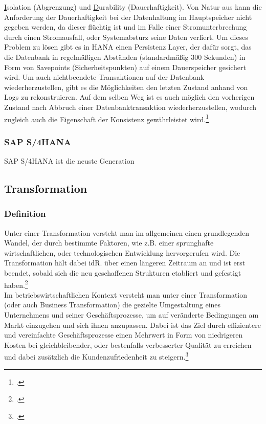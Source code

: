 \underline{I}solation (Abgrenzung) und \underline{D}urability (Dauerhaftigkeit). Von Natur aus kann die Anforderung der Dauerhaftigkeit bei der Datenhaltung im Hauptspeicher nicht gegeben werden, da dieser flüchtig ist und im Falle einer Stromunterbrechung durch einen Stromausfall, oder Systemabsturz seine Daten verliert. Um dieses Problem zu lösen gibt es in HANA einen \glqq{}Persistenz Layer\grqq{}, der dafür sorgt, das die Datenbank in regelmäßigen Abständen (standardmäßig 300 Sekunden) in Form von \glqq{}Savepoints\grqq{} (Sicherheitspunkten) auf einem Dauerspeicher gesichert wird. Um auch nichtbeendete Transaktionen auf der Datenbank wiederherzustellen, gibt es die Möglichkeiten den letzten Zustand anhand von Logs zu rekonstruieren. Auf dem selben Weg ist es auch möglich den vorherigen Zustand nach Abbruch einer Datenbanktransaktion wiederherzustellen, wodurch zugleich auch die Eigenschaft der Konsistenz gewährleistet wird.\footcite[Vgl.][]{rz10-acid}

\subsubsection{SAP S/4HANA} 
SAP S/4HANA ist die neuste Generation 

\subsection{Transformation}
\subsubsection{Definition}
Unter einer Transformation versteht man im allgemeinen einen grundlegenden Wandel, der durch bestimmte Faktoren, wie z.B. einer sprunghafte wirtschaftlichen, oder technologischen Entwicklung hervorgerufen wird. Die Transformation hält dabei idR. über einen längeren Zeitraum an und ist erst beendet, sobald sich die neu geschaffenen Strukturen etabliert und gefestigt haben.\footcite[Vgl.][]{difu}\\ Im betriebswirtschaftlichen Kontext versteht man unter einer Transformation (oder auch Business Transformation) die gezielte Umgestaltung eines Unternehmens und seiner Geschäftsprozesse, um auf veränderte Bedingungen am Markt einzugehen und sich ihnen anzupassen. Dabei ist das Ziel durch effizientere und vereinfachte Geschäftsprozesse einen Mehrwert in Form von niedrigeren Kosten bei gleichbleibender, oder bestenfalls verbesserter Qualität zu erreichen und dabei zusätzlich die Kundenzufriedenheit zu steigern.\footcite[Vgl.][]{leanix}

